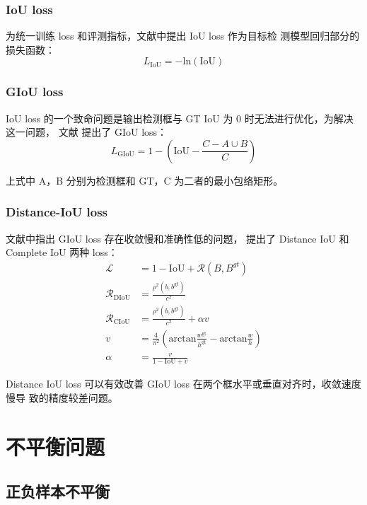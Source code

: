 \subsubsection{IoU loss}
为统一训练 loss 和评测指标，文献中提出 IoU loss 作为目标检
测模型回归部分的损失函数：
\begin{equation}
  L_{\mathrm{IoU}} = - \mathrm{ln} (\mathrm{IoU})
\end{equation}

\subsubsection{GIoU loss}
IoU loss 的一个致命问题是输出检测框与 GT IoU 为 0 时无法进行优化，为解决这一问题，
文献 提出了 GIoU loss：
\begin{equation}
  L_{\mathrm{GIoU}} = 1 - \left( \mathrm{IoU} - \frac{C - A \cup B}{C} \right)
\end{equation}

上式中 A，B 分别为检测框和 GT，C 为二者的最小包络矩形。

\subsubsection{Distance-IoU loss}
文献中指出 GIoU loss 存在收敛慢和准确性低的问题，
提出了 Distance IoU 和 Complete IoU 两种 loss：
\begin{align}
  \mathcal{L} & = 1 - \mathrm{IoU} + \mathcal{R}(B, B^{gt}) \\
  \mathcal{R}_{\mathrm{DIoU}} & = \frac{\rho^2(b, b^{\mathrm{gt}})}{c^2} \\
  \mathcal{R}_{\mathrm{CIoU}} & = \frac{\rho^2(b, b^{\mathrm{gt}})}{c^2} + \alpha v \\
  v & = \frac{4}{\pi^2}\left( \mathrm{arctan}\frac{w^{\mathrm{gt}}}{h^{\mathrm{gt}}} - \mathrm{arctan}\frac{w}{h} \right) \\
  \alpha & = \frac{v}{1 - \mathrm{IoU} + v}
\end{align}

Distance IoU loss 可以有效改善 GIoU loss 在两个框水平或垂直对齐时，收敛速度慢导
致的精度较差问题。

\section{不平衡问题}
\subsection{正负样本不平衡}

